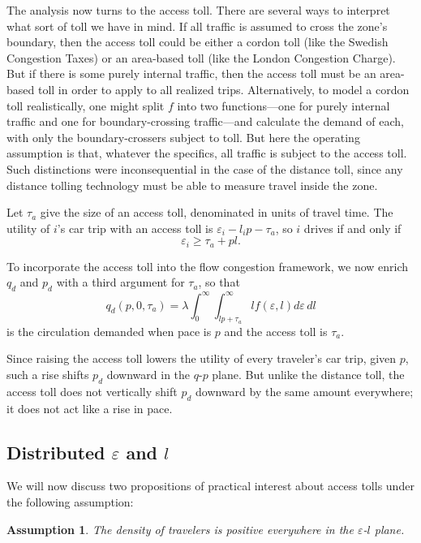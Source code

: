 \documentclass[preprint,authoryear]{elsarticle}
\newcommand{\taua}{\tau_a}
\newcommand{\ve}{\varepsilon}
\newtheorem{assumption}{Assumption}
\begin{document}
The analysis now turns to the access toll. There are several ways to interpret what sort of toll we have in mind. If all traffic is assumed to cross the zone's boundary, then the access toll could be either a cordon toll (like the Swedish Congestion Taxes) or an area-based toll (like the London Congestion Charge). But if there is some purely internal traffic, then the access toll must be an area-based toll in order to apply to all realized trips. Alternatively, to model a cordon toll realistically, one might split $f$ into two functions---one for purely internal traffic and one for boundary-crossing traffic---and calculate the demand of each, with only the boundary-crossers subject to toll. But here the operating assumption is that, whatever the specifics, all traffic is subject to the access toll. Such distinctions were inconsequential in the case of the distance toll, since any distance tolling technology must be able to measure travel inside the zone.

Let $\taua$ give the size of an access toll, denominated in units of travel time. The utility of $i$'s car trip with an access toll is $\ve_i - l_ip - \taua$, so $i$ drives if and only if
\begin{equation}
	\ve_i \geq \taua + pl.
\end{equation}

To incorporate the access toll into the flow congestion framework, we now enrich $q_d$ and $p_d$ with a third argument for $\taua$, so that 
\begin{equation}
    q_d(p,0,\taua) = \lambda \int_0^\infty \int_{lp+\taua}^\infty l f(\varepsilon,l)d\varepsilon\,  dl
\end{equation}
is the circulation demanded when pace is $p$ and the access toll is $\taua$.

Since raising the access toll lowers the utility of every traveler's car trip, given $p$, such a rise shifts $p_d$ downward in the $q$-$p$ plane. But unlike the distance toll, the access toll does not vertically shift $p_d$ downward by the same amount everywhere; it does not act like a rise in pace.

\subsection{Distributed $\ve$ and $l$}

We will now discuss two propositions of practical interest about access tolls under the following assumption:

\begin{assumption}\label{ass:density}
	The density of travelers is positive everywhere in the $\ve$-$l$ plane.
\end{assumption}
\end{document}
